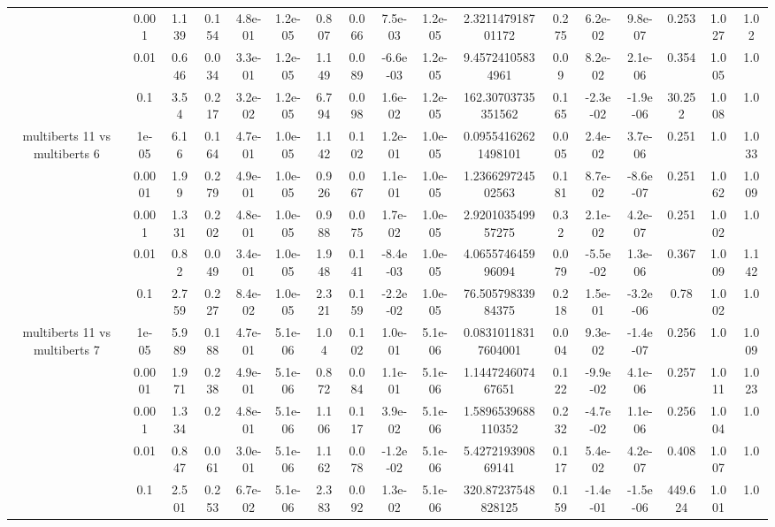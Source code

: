 \begin{tabular}{|c|c|c|c|c|c|c|c|c|c|c|c|c|c|c|c|c|}
 & 0.001 & 1.139 & 0.154 & 4.8e-01 & 1.2e-05 & 0.807 & 0.066 & 7.5e-03 & 1.2e-05 & 2.321147918701172 & 0.275 & 6.2e-02 & 9.8e-07 & 0.253 & 1.027 & 1.02 \\
 & 0.01 & 0.646 & 0.034 & 3.3e-01 & 1.2e-05 & 1.149 & 0.089 & -6.6e-03 & 1.2e-05 & 9.45724105834961 & 0.09 & 8.2e-02 & 2.1e-06 & 0.354 & 1.005 & 1.0 \\
 & 0.1 & 3.54 & 0.217 & 3.2e-02 & 1.2e-05 & 6.794 & 0.098 & 1.6e-02 & 1.2e-05 & 162.30703735351562 & 0.165 & -2.3e-02 & -1.9e-06 & 30.252 & 1.008 & 1.0 \\
\hline
\multirow{5}{*}{multiberts 11 vs multiberts 6} & 1e-05 & 6.16 & 0.164 & 4.7e-01 & 1.0e-05 & 1.142 & 0.102 & 1.2e-01 & 1.0e-05 & 0.09554162621498101 & 0.005 & 2.4e-02 & 3.7e-06 & 0.251 & 1.0 & 1.033 \\
 & 0.0001 & 1.99 & 0.279 & 4.9e-01 & 1.0e-05 & 0.926 & 0.067 & 1.1e-01 & 1.0e-05 & 1.236629724502563 & 0.181 & 8.7e-02 & -8.6e-07 & 0.251 & 1.062 & 1.009 \\
 & 0.001 & 1.331 & 0.202 & 4.8e-01 & 1.0e-05 & 0.988 & 0.075 & 1.7e-02 & 1.0e-05 & 2.920103549957275 & 0.32 & 2.1e-02 & 4.2e-07 & 0.251 & 1.002 & 1.0 \\
 & 0.01 & 0.82 & 0.049 & 3.4e-01 & 1.0e-05 & 1.948 & 0.141 & -8.4e-03 & 1.0e-05 & 4.065574645996094 & 0.079 & -5.5e-02 & 1.3e-06 & 0.367 & 1.009 & 1.142 \\
 & 0.1 & 2.759 & 0.227 & 8.4e-02 & 1.0e-05 & 2.321 & 0.159 & -2.2e-02 & 1.0e-05 & 76.50579833984375 & 0.218 & 1.5e-01 & -3.2e-06 & 0.78 & 1.002 & 1.0 \\
\hline
\multirow{5}{*}{multiberts 11 vs multiberts 7} & 1e-05 & 5.989 & 0.188 & 4.7e-01 & 5.1e-06 & 1.04 & 0.102 & 1.0e-01 & 5.1e-06 & 0.08310118317604001 & 0.004 & 9.3e-02 & -1.4e-07 & 0.256 & 1.0 & 1.009 \\
 & 0.0001 & 1.971 & 0.238 & 4.9e-01 & 5.1e-06 & 0.872 & 0.084 & 1.1e-01 & 5.1e-06 & 1.144724607467651 & 0.122 & -9.9e-02 & 4.1e-06 & 0.257 & 1.011 & 1.023 \\
 & 0.001 & 1.334 & 0.2 & 4.8e-01 & 5.1e-06 & 1.106 & 0.117 & 3.9e-02 & 5.1e-06 & 1.5896539688110352 & 0.232 & -4.7e-02 & 1.1e-06 & 0.256 & 1.004 & 1.0 \\
 & 0.01 & 0.847 & 0.061 & 3.0e-01 & 5.1e-06 & 1.162 & 0.078 & -1.2e-02 & 5.1e-06 & 5.427219390869141 & 0.117 & 5.4e-02 & 4.2e-07 & 0.408 & 1.007 & 1.0 \\
 & 0.1 & 2.501 & 0.253 & 6.7e-02 & 5.1e-06 & 2.383 & 0.092 & 1.3e-02 & 5.1e-06 & 320.87237548828125 & 0.159 & -1.4e-01 & -1.5e-06 & 449.624 & 1.001 & 1.0 \\

\end{tabular}
